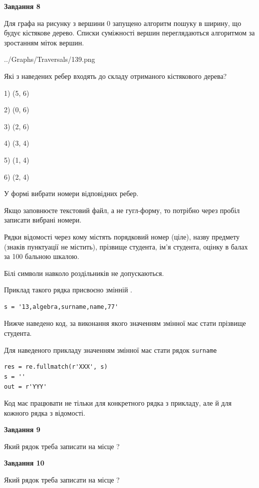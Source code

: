 \documentclass[12pt, ukrainian]{article}
\def\code#1{\Verb!#1!}
\begin{document}
{\begin {large}
{\begin {center}\textbf{Завдання 8}\end {center}}\par
Для графа на рисунку з вершини 0 запущено алгоритм пошуку в ширину, що будує кістякове дерево. Списки суміжності вершин переглядаються алгоритмом за зростанням міток вершин.\par
\begin{center}
	{../Graphs/Traversals/139.png}
\end{center}
\par Які з наведених ребер входять до складу отриманого кістякового дерева?\par
1) (5, 6)\par
2) (0, 6)\par
3) (2, 6)\par
4) (3, 4)\par
5) (1, 4)\par
6) (2, 4)\par
{\vskip 15pt} У формі вибрати номери відповідних ребер.


Якщо заповнюєте текстовий файл, а не гугл-форму, то потрібно через пробіл записа\-ти вибрані номери.\par
\newpage


Рядки відомості через кому містять порядковий номер (ціле), назву предмету (зна\-ків пунктуації не містить), прізвище студента, ім'я студента, оцінку в балах за 100 бальною шкалою.

Білі символи навколо роздільників не допускаються.

Приклад такого рядка присвоєно змінній .



\begin{verbatim}
s = '13,algebra,surname,name,77'
\end{verbatim}


Нижче наведено код, за виконання якого значенням змінної  має стати прізвище студента.

Для наведеного прикладу значенням змінної  має стати рядок \code{surname}



\begin{verbatim}
res = re.fullmatch(r'XXX', s)
s = ''
out = r'YYY'
\end{verbatim}


Код має працювати не тільки для конкретного рядка з прикладу, але й для кожного рядка з відомості.

{\begin {center}\textbf{Завдання 9}\end {center}}\par
Який рядок треба записати на місце  ?\par
\vspace{5mm}


{\begin {center}\textbf{Завдання 10}\end {center}}\par
Який рядок треба записати на місце  ?\par


\newpage


\end {large}}
\end{document}
